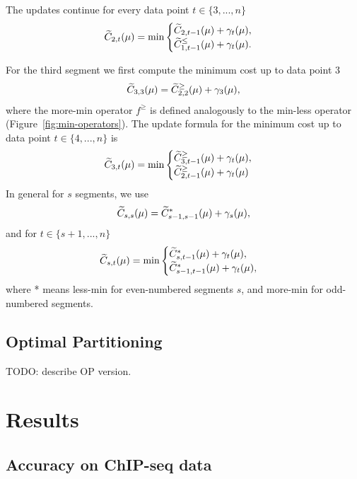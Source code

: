 \documentclass{article}
\begin{document}
The updates continue for every data point $t\in\{3, ..., n\}$
\begin{equation*}
  \widetilde{C}_{2,t}(\mu) = \min
  \begin{cases}
    \widetilde{C}_{2,t-1}(\mu) + \gamma_t(\mu),\\
    \widetilde{C}_{1,t-1}^{\leq}(\mu) + \gamma_t(\mu).
  \end{cases}
\end{equation*}

For the third segment we first compute the minimum cost up to data point 3
\begin{equation*}
  \widetilde{C}_{3,3}(\mu) = \widetilde{C}_{2,2}^{\geq}(\mu) + \gamma_3(\mu),
\end{equation*}
where the more-min operator $f^\geq$ is defined analogously to the
min-less operator (Figure~\ref{fig:min-operators}). The update formula
for the minimum cost up to data point $t\in\{4, ..., n\}$ is
\begin{equation*}
  \widetilde{C}_{3,t}(\mu) = \min
  \begin{cases}
    \widetilde{C}_{3,t-1}^{\geq}(\mu)+\gamma_t(\mu),\\
    \widetilde{C}_{2,t-1}^{\geq}(\mu)+\gamma_t(\mu)
  \end{cases}
\end{equation*}
In general for $s$ segments, we use
\begin{equation}
  \widetilde{C}_{s,s}(\mu) = \widetilde{C}_{s-1,s-1}^{*}(\mu) + \gamma_s(\mu),
\end{equation}
and for $t\in\{s+1, ..., n\}$
\begin{equation}
  \widetilde{C}_{s,t}(\mu) = \min
  \begin{cases}
    \widetilde{C}_{s,t-1}^{*}(\mu)+\gamma_t(\mu),\\
    \widetilde{C}_{s-1,t-1}^{*}(\mu)+\gamma_t(\mu),
  \end{cases}
\end{equation}
where * means less-min for even-numbered segments $s$, and more-min
for odd-numbered segments.

\subsection{Optimal Partitioning}

TODO: describe OP version.

\section{Results}

\subsection{Accuracy on ChIP-seq data}
\end{document}
